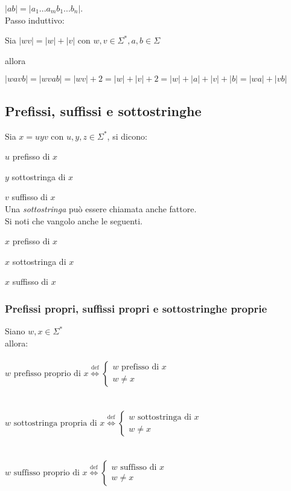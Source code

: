 \documentclass[]{article}
\begin{document}
\mbox{$|ab|=|a_1...a_mb_1...b_n|$}.
\\
Passo induttivo:

Sia
\mbox{$|wv|=|w|+|v|$}
con
\mbox{$w, v \in \Sigma^*, a, b \in \Sigma$}

allora

\mbox{$|wavb| = |wvab| = |wv| + 2 = |w| + |v| + 2 = |w| + |a| + |v| + |b| = |wa| + |vb|$}


\subsection{Prefissi, suffissi e sottostringhe}

Sia \mbox{$x = uyv$} con \mbox{$u, y, z \in \Sigma^*$}, si dicono:

\mbox{$u$} prefisso di \mbox{$x$}

\mbox{$y$} sottostringa di \mbox{$x$}

\mbox{$v$} suffisso di \mbox{$x$}
\\
Una \textit{sottostringa} può essere chiamata anche fattore.
\\
Si noti che vangolo anche le seguenti.

\mbox{$x$} prefisso di \mbox{$x$}

\mbox{$x$} sottostringa di \mbox{$x$}

\mbox{$x$} suffisso di \mbox{$x$}


\subsubsection{Prefissi propri, suffissi propri e sottostringhe proprie}

Siano \mbox{$w, x \in \Sigma^*$}
\\
allora:
\\
\\
\begin{math}
w \text{ prefisso proprio di } x
\overset{\text{def}}{\Leftrightarrow}
\begin{cases}
w \text{ prefisso di } x \\
w \neq x
\end{cases}
\end{math}
\\
\\
\\
\begin{math}
w \text{ sottostringa propria di } x
\overset{\text{def}}{\Leftrightarrow}
\begin{cases}
w \text{ sottostringa di } x \\
w \neq x
\end{cases}
\end{math}
\\
\\
\\
\begin{math}
w \text{ suffisso proprio di } x
\overset{\text{def}}{\Leftrightarrow}
\begin{cases}
w \text{ suffisso di } x \\
w \neq x
\end{cases}
\end{math}
\end{document}
